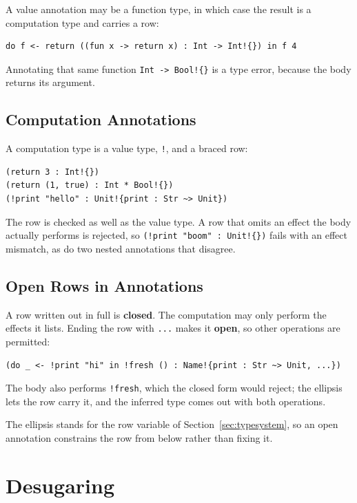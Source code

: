 \documentclass[11pt,a4paper]{article}
\newcommand{\cba}[1]{\lstinline[style=cbainline]{#1}}
\begin{document}
A value annotation may be a function type, in which case the result is a
computation type and carries a row:

\begin{lstlisting}
do f <- return ((fun x -> return x) : Int -> Int!{}) in f 4
\end{lstlisting}

Annotating that same function \texttt{Int -> Bool!\{\}} is a type error,
because the body returns its argument.

\subsection{Computation Annotations}

A computation type is a value type, \texttt{!}, and a braced row:

\begin{lstlisting}
(return 3 : Int!{})
(return (1, true) : Int * Bool!{})
(!print "hello" : Unit!{print : Str ~> Unit})
\end{lstlisting}

The row is checked as well as the value type.  A row that omits an effect the
body actually performs is rejected, so \texttt{(!print "boom" : Unit!\{\})}
fails with an effect mismatch, as do two nested annotations that disagree.

\subsection{Open Rows in Annotations}

A row written out in full is \textbf{closed}.  The computation may only perform
the effects it lists.  Ending the row with \texttt{...} makes it
\textbf{open}, so other operations are permitted:

\begin{lstlisting}
(do _ <- !print "hi" in !fresh () : Name!{print : Str ~> Unit, ...})
\end{lstlisting}

The body also performs \cba{!fresh}, which the closed form would reject; the
ellipsis lets the row carry it, and the inferred type comes out with both
operations.

The ellipsis stands for the row variable of Section~\ref{sec:typesystem}, so
an open annotation constrains the row from below rather than fixing it.

\section{Desugaring}
\label{sec:desugaring}
\end{document}
